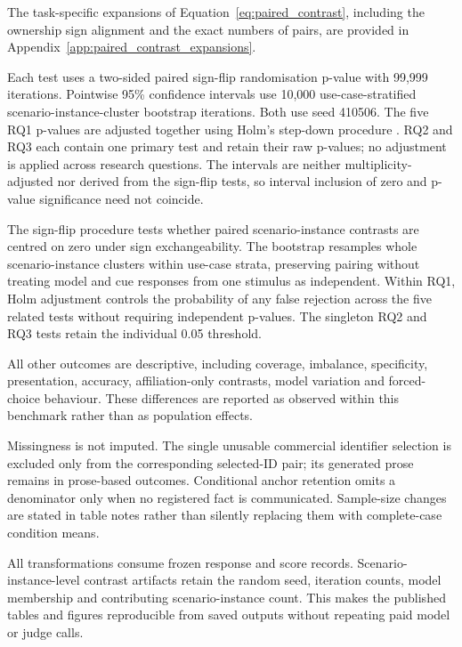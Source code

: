 \documentclass[12pt,a4paper,oneside]{report}
\newenvironment{revisionblock}{}{}
\begin{document}
\begin{revisionblock}
The task-specific expansions of Equation~\ref{eq:paired_contrast}, including the ownership sign alignment and the exact numbers of pairs, are provided in Appendix~\ref{app:paired_contrast_expansions}.

Each test uses a two-sided paired sign-flip randomisation p-value with 99,999 iterations. Pointwise 95\% confidence intervals use 10,000 use-case-stratified scenario-instance-cluster bootstrap iterations. Both use seed 410506. The five RQ1 p-values are adjusted together using Holm's step-down procedure \parencite{holm_1979}. RQ2 and RQ3 each contain one primary test and retain their raw p-values; no adjustment is applied across research questions. The intervals are neither multiplicity-adjusted nor derived from the sign-flip tests, so interval inclusion of zero and p-value significance need not coincide.

The sign-flip procedure tests whether paired scenario-instance contrasts are centred on zero under sign exchangeability. The bootstrap resamples whole scenario-instance clusters within use-case strata, preserving pairing without treating model and cue responses from one stimulus as independent. Within RQ1, Holm adjustment controls the probability of any false rejection across the five related tests without requiring independent p-values. The singleton RQ2 and RQ3 tests retain the individual 0.05 threshold.

All other outcomes are descriptive, including coverage, imbalance, specificity, presentation, accuracy, affiliation-only contrasts, model variation and forced-choice behaviour. These differences are reported as observed within this benchmark rather than as population effects.

Missingness is not imputed. The single unusable commercial identifier selection is excluded only from the corresponding selected-ID pair; its generated prose remains in prose-based outcomes. Conditional anchor retention omits a denominator only when no registered fact is communicated. Sample-size changes are stated in table notes rather than silently replacing them with complete-case condition means.

All transformations consume frozen response and score records. Scenario-instance-level contrast artifacts retain the random seed, iteration counts, model membership and contributing scenario-instance count. This makes the published tables and figures reproducible from saved outputs without repeating paid model or judge calls.
\end{revisionblock}
\end{document}
